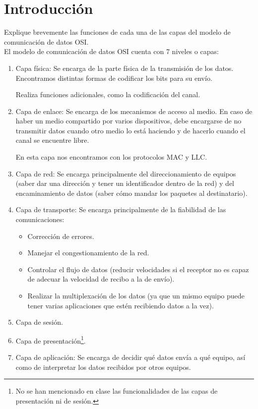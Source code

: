 \section{Introducción}

\begin{ejercicio}
   Explique brevemente las funciones de cada una de las capas del modelo de comunicación de datos \acrshort{OSI}\@. \\

   El modelo de comunicación de datos \acrshort{OSI} cuenta con 7 niveles o capas:
   \begin{enumerate}
       \item Capa física: Se encarga de la parte física de la transmisión de los datos. Encontramos distintas formas de codificar los bits para su envío. 

           Realiza funciones adicionales, como la codificación del canal.
       \item Capa de enlace: Se encarga de los mecanismos de acceso al medio. En caso de haber un medio compartido por varios dispositivos, debe encargarse de no transmitir datos cuando otro medio lo está haciendo y de hacerlo cuando el canal se encuentre libre.

           En esta capa nos encontramos con los protocolos \acrshort{MAC} y \acrshort{LLC}.
       \item Capa de red: Se encarga principalmente del direccionamiento de equipos (saber dar una dirección y tener un identificador dentro de la red) y del encaminamiento de datos (saber cómo mandar los paquetes al destinatario).
       \item Capa de transporte: Se encarga principalmente de la fiabilidad de las comunicaciones:
           \begin{itemize}
               \item Corrección de errores.
               \item Manejar el congestionamiento de la red.
               \item Controlar el flujo de datos (reducir velocidades si el receptor no es capaz de adecuar la velocidad de recibo a la de envío).
               \item Realizar la multiplexación de los datos (ya que un mismo equipo puede tener varias aplicaciones que estén recibiendo datos a la vez).
           \end{itemize}

       \item Capa de sesión.
        \item Capa de presentación\footnote{No se han mencionado en clase las funcionalidades de las capas de presentación ni de sesión.}.
        \item Capa de aplicación: Se encarga de decidir qué datos envía a qué equipo, así como de interpretar los datos recibidos por otros equipos.
   \end{enumerate}
\end{ejercicio}

